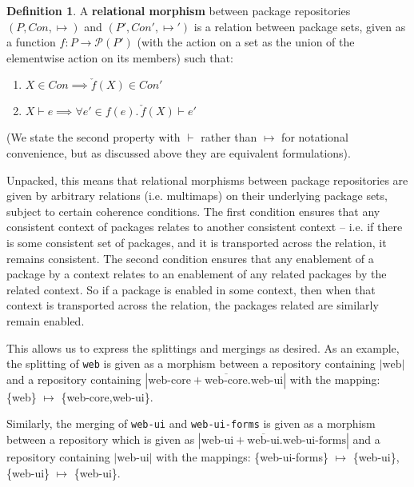 \documentclass[hoptionsi,review,screen,format=sigconf]{acmart}
\theoremstyle{definition}
\newtheorem{definition}{Definition}[section]
\newcommand{\Pc}{\mathcal{P}}
\begin{document}
\begin{definition}
A \textbf{relational morphism} between package repositories \((P, Con, \mapsto)\) and \((P', Con', \mapsto ')\) is a relation between package sets, given as a function \(f : P \to \Pc(P')\) (with the action on a set as the union of the elementwise action on its members) such that:
 \renewcommand{\labelenumi}{\roman{enumi}}
  \begin{enumerate}
   \item \(X \in Con \implies \check{f}(X) \in Con'\)
   \item \(X \vdash e \implies \forall e' \in f(e).\,  \check{f}(X) \vdash e'\) 
 \end{enumerate}

 (We state the second property with \(\vdash\) rather than \(\mapsto\) for notational convenience, but as discussed above they are equivalent formulations).
 \end{definition}

Unpacked, this means that relational morphisms between package repositories are given by arbitrary relations (i.e. multimaps) on their underlying package sets, subject to certain coherence conditions. The first condition ensures that any consistent context of packages relates to another consistent context -- i.e. if there is some consistent set of packages, and it is transported across the relation, it remains consistent. The second condition ensures that any enablement of a package by a context relates to an enablement of any related packages by the related context. So if a package is enabled in some context, then when that context is transported across the relation, the packages related are similarly remain enabled. 

This allows us to express the splittings and mergings as desired. As an example, the splitting of \texttt{web} is given as a morphism between a repository containing \(|\mathrm{web}|\) and  a repository containing \(|\mathrm{web\text{-}core} + \overline{\mathrm{web\text{-}core}}.\mathrm{web\text{-}ui}|\) with the mapping: \{web\} \(\mapsto\) \{web-core,web-ui\}.

Similarly, the merging of \texttt{web-ui} and \texttt{web-ui-forms} is given as a morphism between a repository which is given as \(|\mathrm{web\text{-}ui} + \overline{\mathrm{web\text{-}ui}}.\mathrm{web\text{-}ui\text{-}forms}|\) and a repository containing \(|\mathrm{web\text{-}ui}|\) with the mappings:  \{web-ui-forms\} \(\mapsto\) \{web-ui\}, \{web-ui\} \(\mapsto\) \{web-ui\}.
\end{document}
